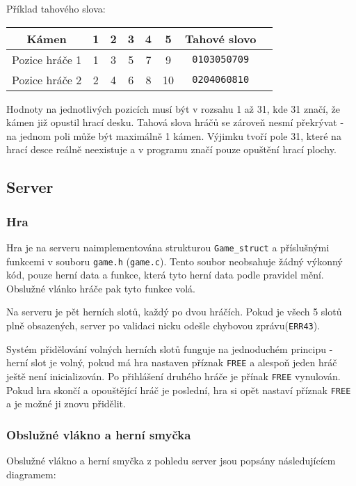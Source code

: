 \documentclass[11pt,a4paper]{scrartcl}
\begin{document}
	Příklad tahového slova:
	
	\begin{center}
		\begin{tabular} {| c || c | c | c | c | c | c | c}
			\hline
			Kámen & 1 & 2 & 3 & 4 & 5 & Tahové slovo\\
			\hline
			\hline
			Pozice hráče 1 & 1& 3& 5& 7& 9 & \verb|0103050709|\\
			\hline
			\hline
			Pozice hráče 2 & 2& 4& 6& 8& 10& \verb|0204060810|\\
						
			\hline
		\end{tabular}
	
	\end{center}
	
	Hodnoty na jednotlivých pozicích musí být v rozsahu 1 až 31, kde 31 značí, že kámen již opustil hrací desku. Tahová slova hráčů se zároveň nesmí překrývat - na jednom poli může být maximálně 1 kámen. Výjimku tvoří pole 31, které na hrací desce reálně neexistuje a v programu značí pouze opuštění hrací plochy.
	
		
	\subsection{Server}
	
	
	\subsubsection{Hra}
	
	Hra je na serveru naimplementována strukturou \verb|Game_struct| a příslušnými funkcemi v souboru \verb|game.h| (\verb|game.c|). Tento soubor neobsahuje žádný výkonný kód, pouze herní data a funkce, která tyto herní data podle pravidel mění. Obslužné vlánko hráče pak tyto funkce volá.
	
	Na serveru je pět herních slotů, každý po dvou hráčích. Pokud je všech 5 slotů plně obsazených, server po validaci nicku odešle chybovou zprávu(\verb|ERR43|).
	
	Systém přidělování volných herních slotů funguje na jednoduchém principu - herní slot je volný, pokud má hra nastaven příznak \verb|FREE| a alespoň jeden hráč ještě není inicializován. Po přihlášení druhého hráče je přínak \verb|FREE| vynulován. Pokud hra skončí a opouštějící hráč je poslední, hra si opět nastaví příznak \verb|FREE| a je možné ji znovu přidělit.
	
	\subsubsection{Obslužné vlákno a herní smyčka}
	Obslužné vlákno a herní smyčka z pohledu server jsou popsány následujícícm diagramem:
	
\end{document}
